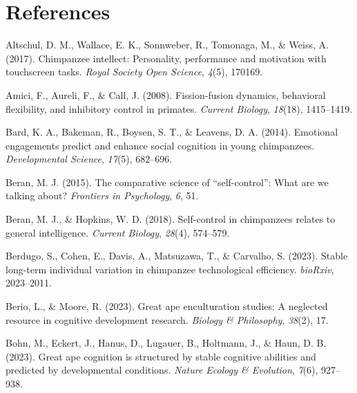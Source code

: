 \documentclass[
  man,floatsintext]{apa6}
\newlength{\cslhangindent}
\newlength{\cslentryspacingunit} %
\newenvironment{CSLReferences}[2] %
 {%
  \setlength{\parindent}{0pt}
  \ifodd #1
  \let\oldpar\par
  \def\par{\hangindent=\cslhangindent\oldpar}
  \fi
  \setlength{\parskip}{#2\cslentryspacingunit}
 }%
 {}
\begin{document}
\newpage

\hypertarget{references}{%
\section{References}\label{references}}

\hypertarget{refs}{}
\begin{CSLReferences}{1}{0}
\leavevmode{}%
Altschul, D. M., Wallace, E. K., Sonnweber, R., Tomonaga, M., \& Weiss, A. (2017). Chimpanzee intellect: Personality, performance and motivation with touchscreen tasks. \emph{Royal Society Open Science}, \emph{4}(5), 170169.

\leavevmode{}%
Amici, F., Aureli, F., \& Call, J. (2008). Fission-fusion dynamics, behavioral flexibility, and inhibitory control in primates. \emph{Current Biology}, \emph{18}(18), 1415--1419.

\leavevmode{}%
Bard, K. A., Bakeman, R., Boysen, S. T., \& Leavens, D. A. (2014). Emotional engagements predict and enhance social cognition in young chimpanzees. \emph{Developmental Science}, \emph{17}(5), 682--696.

\leavevmode{}%
Beran, M. J. (2015). The comparative science of {``self-control''}: What are we talking about? \emph{Frontiers in Psychology}, \emph{6}, 51.

\leavevmode{}%
Beran, M. J., \& Hopkins, W. D. (2018). Self-control in chimpanzees relates to general intelligence. \emph{Current Biology}, \emph{28}(4), 574--579.

\leavevmode{}%
Berdugo, S., Cohen, E., Davis, A., Matsuzawa, T., \& Carvalho, S. (2023). Stable long-term individual variation in chimpanzee technological efficiency. \emph{bioRxiv}, 2023--2011.

\leavevmode{}%
Berio, L., \& Moore, R. (2023). Great ape enculturation studies: A neglected resource in cognitive development research. \emph{Biology \& Philosophy}, \emph{38}(2), 17.

\leavevmode{}%
Bohn, M., Eckert, J., Hanus, D., Lugauer, B., Holtmann, J., \& Haun, D. B. (2023). Great ape cognition is structured by stable cognitive abilities and predicted by developmental conditions. \emph{Nature Ecology \& Evolution}, \emph{7}(6), 927--938.


\end{CSLReferences}
\end{document}
